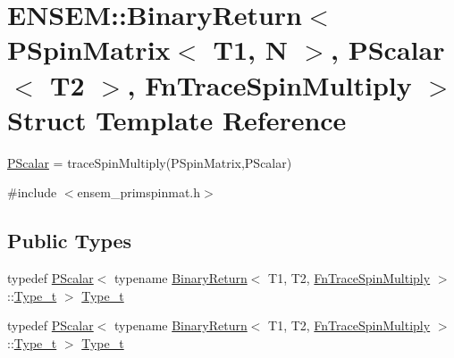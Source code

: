 \hypertarget{structENSEM_1_1BinaryReturn_3_01PSpinMatrix_3_01T1_00_01N_01_4_00_01PScalar_3_01T2_01_4_00_01FnTraceSpinMultiply_01_4}{}\section{E\+N\+S\+EM\+:\+:Binary\+Return$<$ P\+Spin\+Matrix$<$ T1, N $>$, P\+Scalar$<$ T2 $>$, Fn\+Trace\+Spin\+Multiply $>$ Struct Template Reference}
\label{structENSEM_1_1BinaryReturn_3_01PSpinMatrix_3_01T1_00_01N_01_4_00_01PScalar_3_01T2_01_4_00_01FnTraceSpinMultiply_01_4}


\mbox{\hyperlink{classENSEM_1_1PScalar}{P\+Scalar}} = trace\+Spin\+Multiply(\+P\+Spin\+Matrix,\+P\+Scalar)  




{\ttfamily \#include $<$ensem\+\_\+primspinmat.\+h$>$}

\subsection*{Public Types}
\begin{DoxyCompactItemize}
\item 
typedef \mbox{\hyperlink{classENSEM_1_1PScalar}{P\+Scalar}}$<$ typename \mbox{\hyperlink{structENSEM_1_1BinaryReturn}{Binary\+Return}}$<$ T1, T2, \mbox{\hyperlink{structENSEM_1_1FnTraceSpinMultiply}{Fn\+Trace\+Spin\+Multiply}} $>$\+::\mbox{\hyperlink{structENSEM_1_1BinaryReturn_3_01PSpinMatrix_3_01T1_00_01N_01_4_00_01PScalar_3_01T2_01_4_00_01FnTraceSpinMultiply_01_4_ad894a0e2c8a84ee15a5bb11d76eba14d}{Type\+\_\+t}} $>$ \mbox{\hyperlink{structENSEM_1_1BinaryReturn_3_01PSpinMatrix_3_01T1_00_01N_01_4_00_01PScalar_3_01T2_01_4_00_01FnTraceSpinMultiply_01_4_ad894a0e2c8a84ee15a5bb11d76eba14d}{Type\+\_\+t}}
\item 
typedef \mbox{\hyperlink{classENSEM_1_1PScalar}{P\+Scalar}}$<$ typename \mbox{\hyperlink{structENSEM_1_1BinaryReturn}{Binary\+Return}}$<$ T1, T2, \mbox{\hyperlink{structENSEM_1_1FnTraceSpinMultiply}{Fn\+Trace\+Spin\+Multiply}} $>$\+::\mbox{\hyperlink{structENSEM_1_1BinaryReturn_3_01PSpinMatrix_3_01T1_00_01N_01_4_00_01PScalar_3_01T2_01_4_00_01FnTraceSpinMultiply_01_4_ad894a0e2c8a84ee15a5bb11d76eba14d}{Type\+\_\+t}} $>$ \mbox{\hyperlink{structENSEM_1_1BinaryReturn_3_01PSpinMatrix_3_01T1_00_01N_01_4_00_01PScalar_3_01T2_01_4_00_01FnTraceSpinMultiply_01_4_ad894a0e2c8a84ee15a5bb11d76eba14d}{Type\+\_\+t}}
\end{DoxyCompactItemize}


